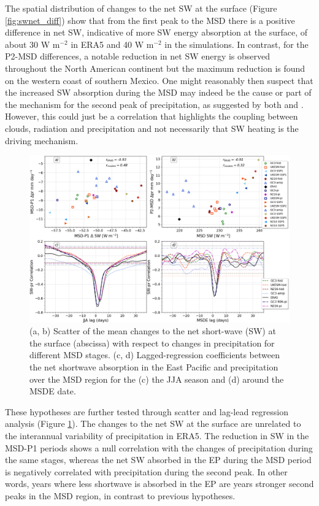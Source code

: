 The spatial distribution of changes to the net SW at the surface (Figure \ref{fig:swnet_diff}) show that from the first peak to the MSD there is a positive difference in net SW, indicative of more SW energy absorption at the surface, of about 30 W m$^{-2}$ in ERA5 and 40 W m$^{-2}$ in the simulations. In contrast, for the P2-MSD differences, a notable reduction in net SW energy is observed throughout the North American continent but the maximum reduction is found on the western coast of southern Mexico. One might reasonably then suspect that the increased SW absorption during the MSD may indeed be the cause or part of the mechanism for the second peak of precipitation, as suggested by both \cite{magana1999} and \cite{karnauskas2013}. However, this could just be a correlation that highlights the coupling between clouds, radiation and precipitation and not necessarily that SW heating is the driving mechanism.

\begin{figure}[t!]
\includegraphics[width=\linewidth]{figures/cloud_scatter_f.png}
\caption[Scatterplot and lagged-regression of surface short-wave]{(a, b) Scatter of the mean changes to the net short-wave (SW) at the surface (abscissa) with respect to changes in precipitation for different MSD stages. (c, d) Lagged-regression coefficients between the net shortwave absorption in the East Pacific and precipitation over the MSD region for the (c) the JJA season and (d) around the MSDE date.}
\label{fig:cloud_scatter}
\end{figure}

These hypotheses are further tested through scatter and lag-lead regression analysis (Figure \ref{fig:cloud_scatter}). The changes to the net SW at the surface are unrelated to the interannual variability of precipitation in ERA5. The reduction in SW in the MSD-P1 periods shows a null correlation with the changes of precipitation during the same stages, whereas the net SW absorbed in the EP during the MSD period is negatively correlated with precipitation during the second peak. In other words, years where less shortwave is absorbed in the EP are years stronger second peaks in the MSD region, in contrast to previous hypotheses. 

